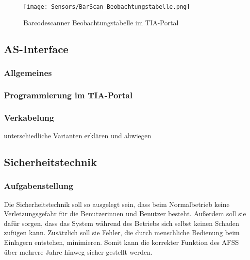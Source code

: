 \begin{figure}[H]
    \centering
    \texttt{[image: Sensors/BarScan\_Beobachtungstabelle.png]}
    \caption{Barcodescanner Beobachtungstabelle im TIA-Portal}
    \label{BarScan_BTabelle}
\end{figure}

\subsection{AS-Interface}

\subsubsection{Allgemeines}

\subsubsection{Programmierung im TIA-Portal}

\subsubsection{Verkabelung}
unterschiedliche Varianten erklären und abwiegen

\subsection{Sicherheitstechnik}
\subsubsection{Aufgabenstellung}
Die Sicherheitstechnik soll so ausgelegt sein, dass beim Normalbetrieb keine Verletzungsgefahr für die Benutzerinnen und Benutzer besteht. Außerdem soll sie dafür sorgen, dass das System während des Betriebs sich selbst keinen Schaden zufügen kann. Zusätzlich soll sie Fehler, die durch menschliche Bedienung beim Einlagern entstehen, minimieren. Somit kann die korrekter Funktion des AFSS über mehrere Jahre hinweg sicher gestellt werden.

